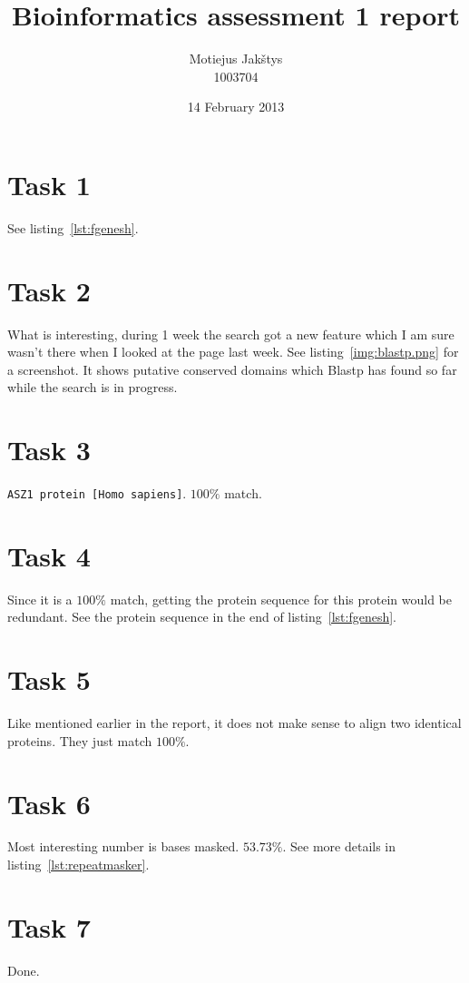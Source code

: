 \documentclass[english,11pt]{article}
\begin{document}
\title{Bioinformatics assessment 1 report}
\author{Motiejus Jakštys\\ 1003704}
\date{14 February 2013}

\maketitle
\tableofcontents

\section{Task 1}
\label{sec:task1}
See listing~\ref{lst:fgenesh}.

\section{Task 2}
What is interesting, during 1 week the search got a new feature which
I am sure wasn't there when I looked at the page last week. See
listing~\ref{img:blastp.png} for a screenshot. It shows putative conserved
domains which Blastp has found so far while the search is in progress.

\section{Task 3}
\texttt{ASZ1 protein [Homo sapiens]}. $100\%$ match.

\section{Task 4}
Since it is a $100\%$ match, getting the protein sequence for this protein would
be redundant. See the protein sequence in the end of listing~\ref{lst:fgenesh}.

\section{Task 5}
Like mentioned earlier in the report, it does not make sense to align two
identical proteins. They just match $100\%$.

\section{Task 6}
\label{sec:task6}
Most interesting number is bases masked. $53.73\%$. See more details in
listing~\ref{lst:repeatmasker}.

\section{Task 7}
Done.
\end{document}
